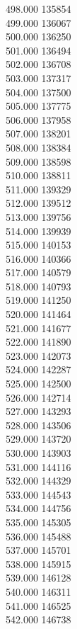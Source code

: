 { 498.000	135854 \\
 499.000	136067 \\
 500.000	136250 \\
 501.000	136494 \\
 502.000	136708 \\
 503.000	137317 \\
 504.000	137500 \\
 505.000	137775 \\
 506.000	137958 \\
 507.000	138201 \\
 508.000	138384 \\
 509.000	138598 \\
 510.000	138811 \\
 511.000	139329 \\
 512.000	139512 \\
 513.000	139756 \\
 514.000	139939 \\
 515.000	140153 \\
 516.000	140366 \\
 517.000	140579 \\
 518.000	140793 \\
 519.000	141250 \\
 520.000	141464 \\
 521.000	141677 \\
 522.000	141890 \\
 523.000	142073 \\
 524.000	142287 \\
 525.000	142500 \\
 526.000	142714 \\
 527.000	143293 \\
 528.000	143506 \\
 529.000	143720 \\
 530.000	143903 \\
 531.000	144116 \\
 532.000	144329 \\
 533.000	144543 \\
 534.000	144756 \\
 535.000	145305 \\
 536.000	145488 \\
 537.000	145701 \\
 538.000	145915 \\
 539.000	146128 \\
 540.000	146311 \\
 541.000	146525 \\
 542.000	146738 \\
}
